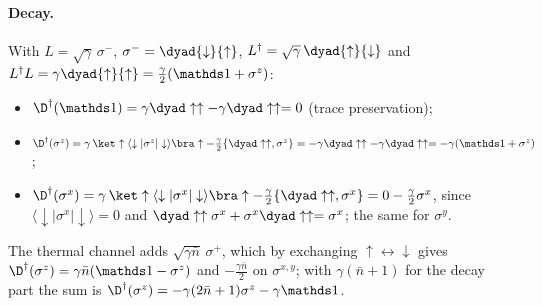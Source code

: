 \paragraph{Decay.} With $L = \sqrt\gamma\,\sigma^-$, $\sigma^- = \dyad{\downarrow}{\uparrow}$, $L^\dagger = \sqrt\gamma\,\dyad{\uparrow}{\downarrow}$ and $L^\dagger L = \gamma\dyad{\uparrow}{\uparrow} = \tfrac\gamma2(\mathds 1 + \sigma^z)$:
\begin{itemize}
\item $\D^\dagger(\mathds 1) = \gamma\dyad\uparrow\uparrow - \gamma\dyad\uparrow\uparrow = 0$ (trace preservation);
\item $\D^\dagger(\sigma^z) = \gamma\,\ket\uparrow\langle\downarrow\vert\sigma^z\vert\downarrow\rangle\bra\uparrow - \tfrac\gamma2\{\dyad\uparrow\uparrow, \sigma^z\} = -\gamma\dyad\uparrow\uparrow - \gamma\dyad\uparrow\uparrow = -\gamma(\mathds 1 + \sigma^z)$;
\item $\D^\dagger(\sigma^x) = \gamma\,\ket\uparrow\langle\downarrow\vert\sigma^x\vert\downarrow\rangle\bra\uparrow - \tfrac\gamma2\{\dyad\uparrow\uparrow, \sigma^x\} = 0 - \tfrac\gamma2\sigma^x$, since $\langle\downarrow\vert\sigma^x\vert\downarrow\rangle = 0$ and $\dyad\uparrow\uparrow\sigma^x + \sigma^x\dyad\uparrow\uparrow = \sigma^x$; the same for $\sigma^y$.
\end{itemize}
The thermal channel adds $\sqrt{\gamma\bar n}\,\sigma^+$, which by exchanging $\uparrow \leftrightarrow \downarrow$ gives $\D^\dagger(\sigma^z) = \gamma\bar n(\mathds 1 - \sigma^z)$ and $-\tfrac{\gamma\bar n}2$ on $\sigma^{x,y}$; with $\gamma(\bar n+1)$ for the decay part the sum is $\D^\dagger(\sigma^z) = -\gamma(2\bar n+1)\sigma^z - \gamma\mathds 1$.

